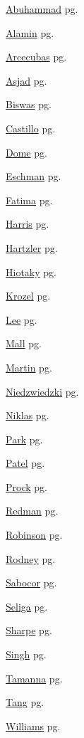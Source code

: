 \item \hyperlink{Abuhammad.1}{Abuhammad} pg. \pageref{abs:Abuhammad}
\item \hyperlink{Alamin.1}{Alamin} pg. \pageref{abs:Alamin}
\item \hyperlink{Arcecubas.1}{Arcecubas} pg. \pageref{abs:Arcecubas}
\item \hyperlink{Asjad.1}{Asjad} pg. \pageref{abs:Asjad}
\item \hyperlink{Biswas.1}{Biswas} pg. \pageref{abs:Biswas}
\item \hyperlink{Castillo.1}{Castillo} pg. \pageref{abs:Castillo}
\item \hyperlink{Dome.1}{Dome} pg. \pageref{abs:Dome}
\item \hyperlink{Eschman.1}{Eschman} pg. \pageref{abs:Eschman}
\item \hyperlink{Fatima.1}{Fatima} pg. \pageref{abs:Fatima}
\item \hyperlink{Harris.1}{Harris} pg. \pageref{abs:Harris}
\item \hyperlink{Hartzler.1}{Hartzler} pg. \pageref{abs:Hartzler}
\item \hyperlink{Hiotaky.1}{Hiotaky} pg. \pageref{abs:Hiotaky}
\item \hyperlink{Krozel.1}{Krozel} pg. \pageref{abs:Krozel}
\item \hyperlink{Lee.1}{Lee} pg. \pageref{abs:Lee}
\item \hyperlink{Mall.1}{Mall} pg. \pageref{abs:Mall}
\item \hyperlink{Martin.1}{Martin} pg. \pageref{abs:Martin}
\item \hyperlink{Niedzwiedzki.1}{Niedzwiedzki} pg. \pageref{abs:Niedzwiedzki}
\item \hyperlink{Niklas.1}{Niklas} pg. \pageref{abs:Niklas}
\item \hyperlink{Park.1}{Park} pg. \pageref{abs:Park}
\item \hyperlink{Patel.1}{Patel} pg. \pageref{abs:Patel}
\item \hyperlink{Prock.1}{Prock} pg. \pageref{abs:Prock}
\item \hyperlink{Redman.1}{Redman} pg. \pageref{abs:Redman}
\item \hyperlink{Robinson.1}{Robinson} pg. \pageref{abs:Robinson}
\item \hyperlink{Rodney.1}{Rodney} pg. \pageref{abs:Rodney}
\item \hyperlink{Sabocor.1}{Sabocor} pg. \pageref{abs:Sabocor}
\item \hyperlink{Seliga.1}{Seliga} pg. \pageref{abs:Seliga}
\item \hyperlink{Sharpe.1}{Sharpe} pg. \pageref{abs:Sharpe}
\item \hyperlink{Singh.1}{Singh} pg. \pageref{abs:Singh}
\item \hyperlink{Tamanna.1}{Tamanna} pg. \pageref{abs:Tamanna}
\item \hyperlink{Tang.1}{Tang} pg. \pageref{abs:Tang}
\item \hyperlink{Williams.1}{Williams} pg. \pageref{abs:Williams}
